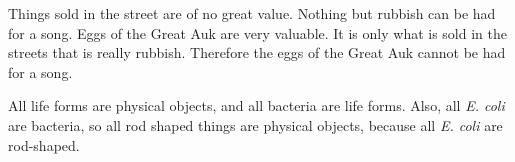 \begin{exercises}
\item \label{itm:Auk} Things sold in the street are of no great value. Nothing but rubbish can be had for a song. Eggs of the Great Auk are very valuable. It is only what is sold in the streets that is really rubbish. Therefore the eggs of the Great Auk cannot be had for a song.




\item All life forms are physical objects, and all bacteria are life forms. Also, all \textit{E. coli} are bacteria, so all rod shaped things are physical objects, because all \textit{E. coli} are rod-shaped. 
   
 

\end{exercises}
